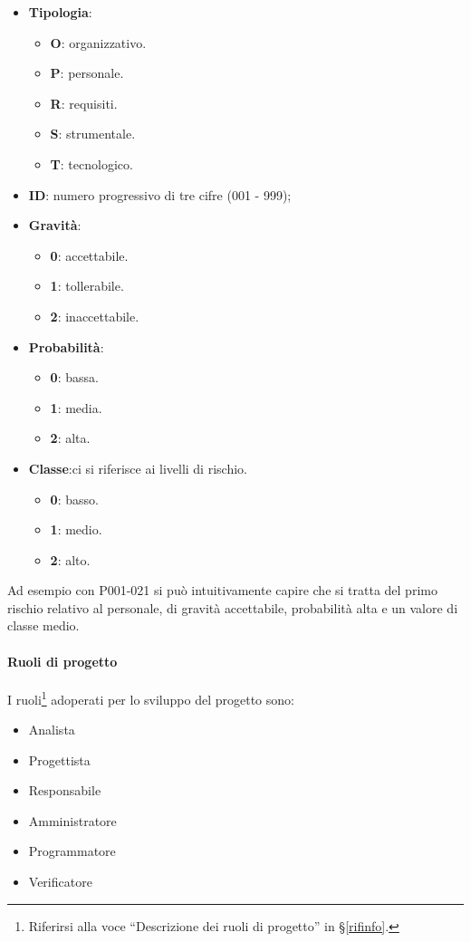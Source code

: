 			\begin{itemize}
				\item \textbf{Tipologia}:
				\begin{itemize}
					\item \textbf{O}: organizzativo.
					\item \textbf{P}: personale.
					\item \textbf{R}: requisiti.
					\item \textbf{S}: strumentale.
					\item \textbf{T}: tecnologico.
				\end{itemize}

				\item \textbf{ID}: numero progressivo di tre cifre (001 - 999);
				\item \textbf{Gravità}:
				\begin{itemize}
					\item \textbf{0}: accettabile.
					\item \textbf{1}: tollerabile.
					\item \textbf{2}: inaccettabile.
				\end{itemize}

				\item \textbf{Probabilità}:
				\begin{itemize}
					\item \textbf{0}: bassa.
					\item \textbf{1}: media.
					\item \textbf{2}: alta.
				\end{itemize}

				\item \textbf{Classe}:ci si riferisce ai livelli di rischio.
				\begin{itemize}
					\item \textbf{0}: basso.
					\item \textbf{1}: medio.
					\item \textbf{2}: alto.
				\end{itemize}
			\end{itemize}

			Ad esempio con P001-021 si può intuitivamente capire che si tratta del primo rischio relativo al personale, di gravità accettabile, probabilità alta e un valore di classe medio.

			\paragraph{Ruoli di progetto}
			I ruoli\footnote{Riferirsi alla voce ``Descrizione dei ruoli di progetto'' in \S\ref{rifinfo}.} adoperati per lo sviluppo del progetto sono:
			\begin{itemize}[noitemsep]
				\item Analista
				\item Progettista
				\item Responsabile
				\item Amministratore
				\item Programmatore
				\item Verificatore
			\end{itemize}

